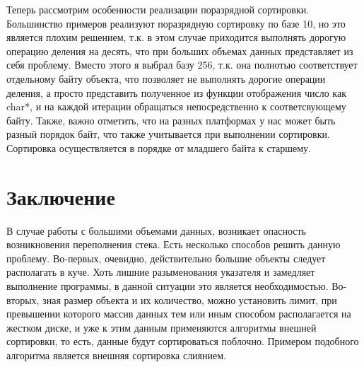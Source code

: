 \documentclass[a4paper, 14pt]{report}
\begin{document}
Теперь рассмотрим особенности реализации поразрядной сортировки. Большинство примеров реализуют поразрядную сортировку по базе 10, но это является плохим решением, т.к. в этом случае приходится выполнять дорогую операцию деления на десять, что при больших объемах данных представляет из себя проблему. Вместо этого я выбрал базу 256, т.к. она полнотью соответствует отдельному байту объекта, что позволяет не выполнять дорогие операции деления, а просто представить полученное из функции отображения число как char*, и на каждой итерации обращаться непосредственно к соответсвующему байту. Также, важно отметить, что на разных платформах у нас может быть разный порядок байт, что также учитывается при выполнении сортировки. Сортировка осуществляется в порядке от младшего байта к старшему.

\section{Заключение}
В случае работы с большими объемами данных, возникает опасность возникновения переполнения стека. Есть несколько способов решить данную проблему. Во-первых, очевидно, действительно большие объекты следует располагать в куче. Хоть лишние разыменования указателя и замедляет выполнение программы, в данной ситуации это является необходимостью. Во-вторых, зная размер объекта и их количество, можно установить лимит, при превышении которого массив данных тем или иным способом располагается на жестком диске, и уже к этим данным применяются алгоритмы внешней сортировки, то есть, данные будут сортироваться поблочно. Примером подобного алгоритма является внешняя сортировка слиянием.
\end{document}
